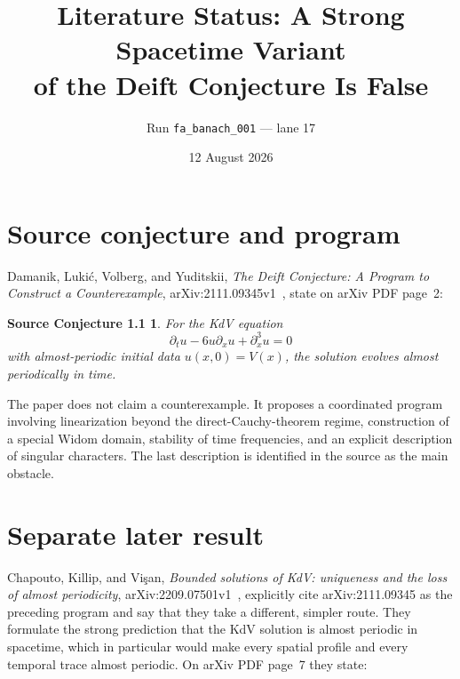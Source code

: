 \documentclass[11pt]{article}
\title{Literature Status: A Strong Spacetime Variant\\
of the Deift Conjecture Is False}
\author{Run \texttt{fa\_banach\_001} --- lane 17}
\date{12 August 2026}
\newtheorem*{conjecture}{Source Conjecture 1.1}
\begin{document}
\maketitle

\begin{center}
\end{center}

\section{Source conjecture and program}

Damanik, Luki\'c, Volberg, and Yuditskii,
\emph{The Deift Conjecture: A Program to Construct a Counterexample},
arXiv:2111.09345v1~\cite{source}, state on arXiv PDF page~2:

\begin{conjecture}
For the KdV equation
\[
  \partial_tu-6u\partial_xu+\partial_x^3u=0
\]
with almost-periodic initial data $u(x,0)=V(x)$, the solution evolves almost
periodically in time.
\end{conjecture}

The paper does not claim a counterexample.  It proposes a coordinated program
involving linearization beyond the direct-Cauchy-theorem regime, construction
of a special Widom domain, stability of time frequencies, and an explicit
description of singular characters.  The last description is identified in
the source as the main obstacle.

\section{Separate later result}

Chapouto, Killip, and Vi\c{s}an,
\emph{Bounded solutions of KdV: uniqueness and the loss of almost
periodicity}, arXiv:2209.07501v1~\cite{laterpaper}, explicitly cite
arXiv:2111.09345 as the preceding program and say that they take a different,
simpler route.  They formulate the strong prediction that the KdV solution is
almost periodic in spacetime, which in particular would make every spatial
profile and every temporal trace almost periodic.  On arXiv PDF page~7 they
state:
\end{document}
